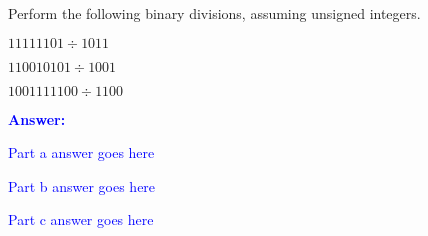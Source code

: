 \item{}
Perform the following binary divisions, assuming unsigned integers.
\begin{list}{\textbf{}}{}
    \item\noindent$11111101\div1011$\\
    \item\noindent$110010101\div1001$\\
    \item\noindent$1001111100\div1100$\\
\end{list}
\vskip12pt
\ifanswers
\textcolor{blue}{
\textbf{Answer:}\\
\begin{list}{\textbf{}}{}
    \item Part a answer goes here
    \item Part b answer goes here
    \item Part c answer goes here
\end{list}
}
\newpage
\fi
